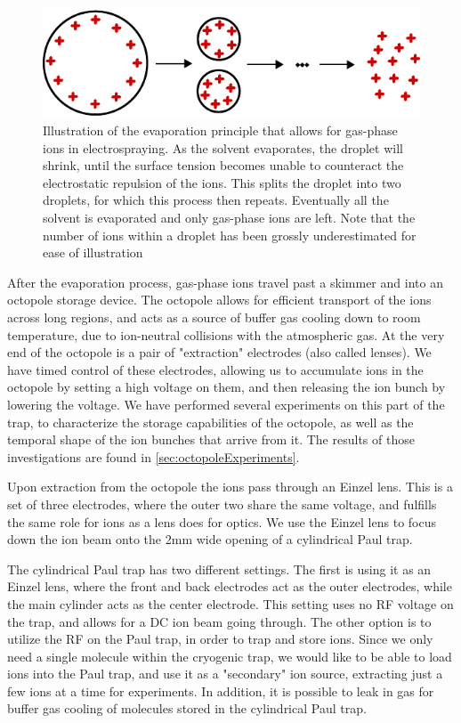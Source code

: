 \begin{figure}
    \centering
    \includegraphics{main/evaporation.pdf}
    \caption{Illustration of the evaporation principle that allows for gas-phase ions in electrospraying. As the solvent evaporates, the droplet will shrink, until the surface tension becomes unable to counteract the electrostatic repulsion of the ions. This splits the droplet into two droplets, for which this process then repeats. Eventually all the solvent is evaporated and only gas-phase ions are left. Note that the number of ions within a droplet has been grossly underestimated for ease of illustration}
    \label{fig:evaporation}
\end{figure}

After the evaporation process, gas-phase ions travel past a skimmer and into an octopole storage device. The octopole allows for efficient transport of the ions across long regions, and acts as a source of buffer gas cooling down to room temperature, due to ion-neutral collisions with the atmospheric gas. At the very end of the octopole is a pair of "extraction" electrodes (also called lenses). We have timed control of these electrodes, allowing us to accumulate ions in the octopole by setting a high voltage on them, and then releasing the ion bunch by lowering the voltage. We have performed several experiments on this part of the trap, to characterize the storage capabilities of the octopole, as well as the temporal shape of the ion bunches that arrive from it. The results of those investigations are found in \cref{sec:octopoleExperiments}.

Upon extraction from the octopole the ions pass through an Einzel lens. This is a set of three electrodes, where the outer two share the same voltage, and fulfills the same role for ions as a lens does for optics. We use the Einzel lens to focus down the ion beam onto the 2mm wide opening of a cylindrical Paul trap.

The cylindrical Paul trap has two different settings. The first is using it as an Einzel lens, where the front and back electrodes act as the outer electrodes, while the main cylinder acts as the center electrode. This setting uses no RF voltage on the trap, and allows for a DC ion beam going through.
The other option is to utilize the RF on the Paul trap, in order to trap and store ions. Since we only need a single molecule within the cryogenic trap, we would like to be able to load ions into the Paul trap, and use it as a "secondary" ion source, extracting just a few ions at a time for experiments.
In addition, it is possible to leak in gas for buffer gas cooling of molecules stored in the cylindrical Paul trap.

